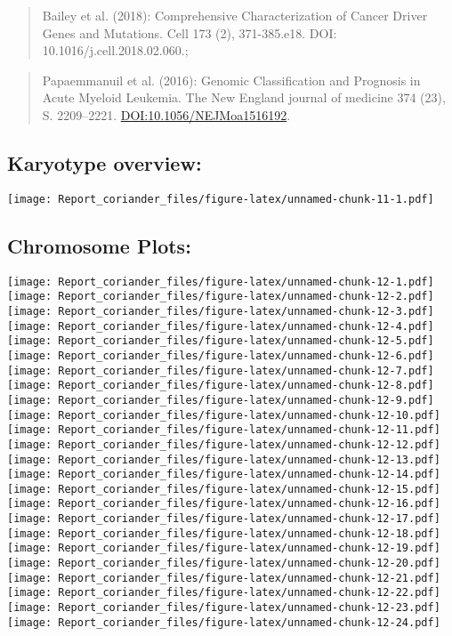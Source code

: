 \documentclass[]{article}
\begin{document}
\begin{quote}
Bailey et al. (2018): Comprehensive Characterization of Cancer Driver
Genes and Mutations. Cell 173 (2), 371-385.e18. DOI:
10.1016/j.cell.2018.02.060.;
\end{quote}

\begin{quote}
Papaemmanuil et al. (2016): Genomic Classification and Prognosis in
Acute Myeloid Leukemia. The New England journal of medicine 374 (23), S.
2209--2221. \url{DOI:10.1056/NEJMoa1516192}.
\end{quote}

\hypertarget{karyotype-overview}{%
\subsection{Karyotype overview:}\label{karyotype-overview}}

\texttt{[image: Report\_coriander\_files/figure-latex/unnamed-chunk-11-1.pdf]}

\hypertarget{chromosome-plots}{%
\subsection{Chromosome Plots:}\label{chromosome-plots}}

\texttt{[image: Report\_coriander\_files/figure-latex/unnamed-chunk-12-1.pdf]}
\texttt{[image: Report\_coriander\_files/figure-latex/unnamed-chunk-12-2.pdf]}
\texttt{[image: Report\_coriander\_files/figure-latex/unnamed-chunk-12-3.pdf]}
\texttt{[image: Report\_coriander\_files/figure-latex/unnamed-chunk-12-4.pdf]}
\texttt{[image: Report\_coriander\_files/figure-latex/unnamed-chunk-12-5.pdf]}
\texttt{[image: Report\_coriander\_files/figure-latex/unnamed-chunk-12-6.pdf]}
\texttt{[image: Report\_coriander\_files/figure-latex/unnamed-chunk-12-7.pdf]}
\texttt{[image: Report\_coriander\_files/figure-latex/unnamed-chunk-12-8.pdf]}
\texttt{[image: Report\_coriander\_files/figure-latex/unnamed-chunk-12-9.pdf]}
\texttt{[image: Report\_coriander\_files/figure-latex/unnamed-chunk-12-10.pdf]}
\texttt{[image: Report\_coriander\_files/figure-latex/unnamed-chunk-12-11.pdf]}
\texttt{[image: Report\_coriander\_files/figure-latex/unnamed-chunk-12-12.pdf]}
\texttt{[image: Report\_coriander\_files/figure-latex/unnamed-chunk-12-13.pdf]}
\texttt{[image: Report\_coriander\_files/figure-latex/unnamed-chunk-12-14.pdf]}
\texttt{[image: Report\_coriander\_files/figure-latex/unnamed-chunk-12-15.pdf]}
\texttt{[image: Report\_coriander\_files/figure-latex/unnamed-chunk-12-16.pdf]}
\texttt{[image: Report\_coriander\_files/figure-latex/unnamed-chunk-12-17.pdf]}
\texttt{[image: Report\_coriander\_files/figure-latex/unnamed-chunk-12-18.pdf]}
\texttt{[image: Report\_coriander\_files/figure-latex/unnamed-chunk-12-19.pdf]}
\texttt{[image: Report\_coriander\_files/figure-latex/unnamed-chunk-12-20.pdf]}
\texttt{[image: Report\_coriander\_files/figure-latex/unnamed-chunk-12-21.pdf]}
\texttt{[image: Report\_coriander\_files/figure-latex/unnamed-chunk-12-22.pdf]}
\texttt{[image: Report\_coriander\_files/figure-latex/unnamed-chunk-12-23.pdf]}
\texttt{[image: Report\_coriander\_files/figure-latex/unnamed-chunk-12-24.pdf]}
\end{document}
